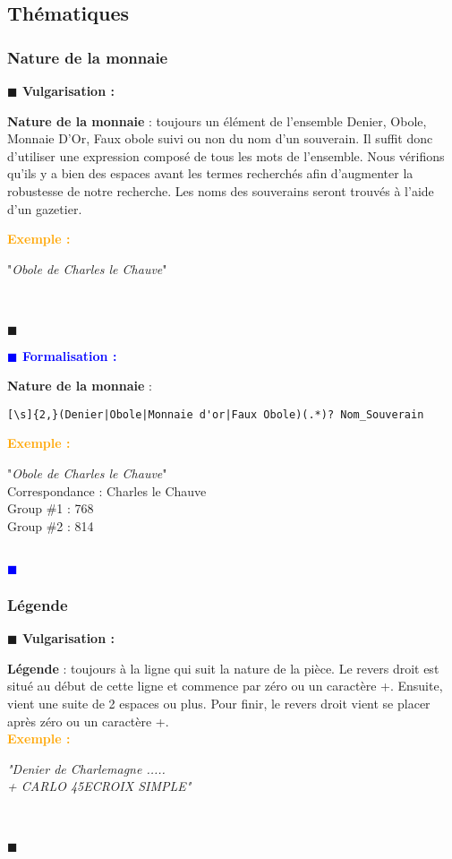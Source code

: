 \documentclass[a4paper, 11pt]{article}
\newenvironment{vulgarisation}
    {
    \textbf{\textcolor{dark-blue}{$\blacksquare$  Vulgarisation : \\}}

    }
    {
    ~\\\textcolor{dark-blue}{$\blacksquare$}\\
    }
\newenvironment{formalisation}
    {
    \textbf{\textcolor{blue}{$\blacksquare$  Formalisation : \\}}
    }
    {
    ~\\\textcolor{blue}{$\blacksquare$}\\
    }
\newenvironment{exemple}
    {
    \textbf{\textcolor{orange}{
    Exemple : \\}}
    }
    {\\
    }
\begin{document}
\newpage
\subsection{Thématiques}
\subsubsection{Nature de la monnaie}
\begin{vulgarisation}
\textbf{Nature de la monnaie} : toujours un élément de l'ensemble {Denier, Obole, Monnaie D'Or, Faux obole} suivi ou non du nom d'un souverain. Il suffit donc d'utiliser une expression composé de tous les mots de l'ensemble. Nous vérifions qu'ils y a bien des espaces avant les termes recherchés afin d'augmenter la robustesse de notre recherche. Les noms des souverains seront trouvés à l'aide d'un gazetier.

\begin{exemple}
"\emph{Obole de Charles le Chauve}" \\
\end{exemple}
\end{vulgarisation}

\begin{formalisation}
\textbf{Nature de la monnaie} :
\begin{verbatim}
[\s]{2,}(Denier|Obole|Monnaie d'or|Faux Obole)(.*)? Nom_Souverain
\end{verbatim}
\begin{exemple}
"\emph{Obole de Charles le Chauve}" \\
Correspondance : Charles le Chauve \\
Group \#1 : 768 \\
Group \#2 : 814
\end{exemple}
\end{formalisation}

\subsubsection{Légende}
\begin{vulgarisation}
\textbf{Légende} : toujours à la ligne qui suit la nature de la pièce. Le revers droit est situé au début de cette ligne et commence par zéro ou un caractère +. Ensuite, vient une suite de 2 espaces ou plus. Pour finir, le revers droit vient se placer après zéro ou un caractère +.\\
\begin{exemple}
\emph{"Denier de Charlemagne ..... \\+ CARLO  45E\indent\indent CROIX SIMPLE"}\\
\end{exemple}
\end{vulgarisation}
\end{document}
